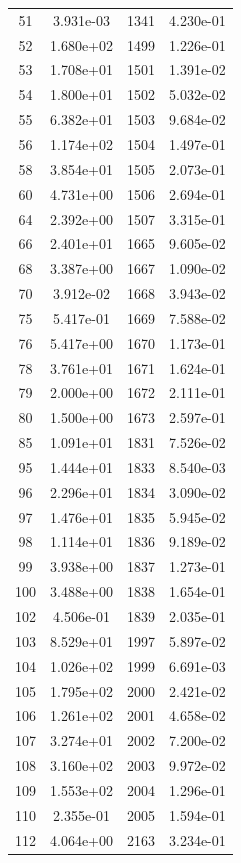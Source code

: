 \documentclass[12pt]{article}
\begin{document}
\begin{longtable}{@{}cccc@{}}
51 & 3.931e-03 & 1341 & 4.230e-01 \\
52 & 1.680e+02 & 1499 & 1.226e-01 \\
53 & 1.708e+01 & 1501 & 1.391e-02 \\
54 & 1.800e+01 & 1502 & 5.032e-02 \\
55 & 6.382e+01 & 1503 & 9.684e-02 \\
56 & 1.174e+02 & 1504 & 1.497e-01 \\
58 & 3.854e+01 & 1505 & 2.073e-01 \\
60 & 4.731e+00 & 1506 & 2.694e-01 \\
64 & 2.392e+00 & 1507 & 3.315e-01 \\
66 & 2.401e+01 & 1665 & 9.605e-02 \\
68 & 3.387e+00 & 1667 & 1.090e-02 \\
70 & 3.912e-02 & 1668 & 3.943e-02 \\
75 & 5.417e-01 & 1669 & 7.588e-02 \\
76 & 5.417e+00 & 1670 & 1.173e-01 \\
78 & 3.761e+01 & 1671 & 1.624e-01 \\
79 & 2.000e+00 & 1672 & 2.111e-01 \\
80 & 1.500e+00 & 1673 & 2.597e-01 \\
85 & 1.091e+01 & 1831 & 7.526e-02 \\
95 & 1.444e+01 & 1833 & 8.540e-03 \\
96 & 2.296e+01 & 1834 & 3.090e-02 \\
97 & 1.476e+01 & 1835 & 5.945e-02 \\
98 & 1.114e+01 & 1836 & 9.189e-02 \\
99 & 3.938e+00 & 1837 & 1.273e-01 \\
100 & 3.488e+00 & 1838 & 1.654e-01 \\
102 & 4.506e-01 & 1839 & 2.035e-01 \\
103 & 8.529e+01 & 1997 & 5.897e-02 \\
104 & 1.026e+02 & 1999 & 6.691e-03 \\
105 & 1.795e+02 & 2000 & 2.421e-02 \\
106 & 1.261e+02 & 2001 & 4.658e-02 \\
107 & 3.274e+01 & 2002 & 7.200e-02 \\
108 & 3.160e+02 & 2003 & 9.972e-02 \\
109 & 1.553e+02 & 2004 & 1.296e-01 \\
110 & 2.355e-01 & 2005 & 1.594e-01 \\
112 & 4.064e+00 & 2163 & 3.234e-01 \\

\end{longtable}
\end{document}
